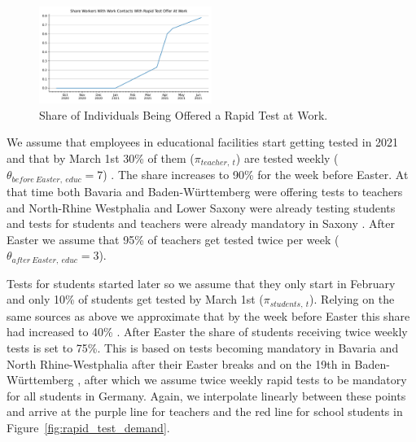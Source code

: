 \begin{figure}
    \centering
    \includegraphics[width=0.5\textwidth]{figures/results/figures/data/testing/share_of_workers_with_rapid_test_offer_at_work}
    \caption{Share of Individuals Being Offered a Rapid Test at Work.}
\end{figure}
\FloatBarrier


We assume that employees in educational facilities start getting tested in 2021 and that
by March 1st 30\% of them ($\pi_{teacher,\:t}$) are tested weekly
($\theta_{before\:Easter,\:educ} = 7$) \citep{schoolNRWd, schoolBWc,
schoolBYb,SueddeutscheZeitung2021b,Zeit2021}. The share increases to 90\% for the week before
Easter. At that time both Bavaria \citep{STMGP2021} and Baden-Württemberg
\citep{MinisteriumKultus2021} were offering tests to teachers and North-Rhine Westphalia
\citep{SchulministeriumNRW2021} and Lower Saxony \citep{NSMK2021} were already testing
students and tests for students and teachers were already mandatory in Saxony
\citep{SMK2021}. After Easter we assume that 95\% of teachers get tested twice per week
($\theta_{after\:Easter,\:educ} = 3$).

Tests for students started later \citep{MinisteriumKultus2021, SchulministeriumNRW2021}
so we assume that they only start in February and only 10\% of students get tested by
March 1st ($\pi_{students,\:t}$). Relying on the same sources as above we approximate
that by the week before Easter this share had increased to 40\%
\citep{SchulministeriumNRW2021}. After Easter the share of students receiving twice
weekly tests is set to 75\%. This is based on tests becoming mandatory in Bavaria
\citep{BayerischeStaatskanzlei2021} and North Rhine-Westphalia
\citep{SchulministeriumNRW2021b} after their Easter breaks and on the 19th in
Baden-Württemberg \citep{KMBaWue2021}, after which we assume twice weekly rapid tests to
be mandatory for all students in Germany. Again, we interpolate linearly between these
points and arrive at the purple line for teachers and the red line for school students in
Figure~\ref{fig:rapid_test_demand}.

